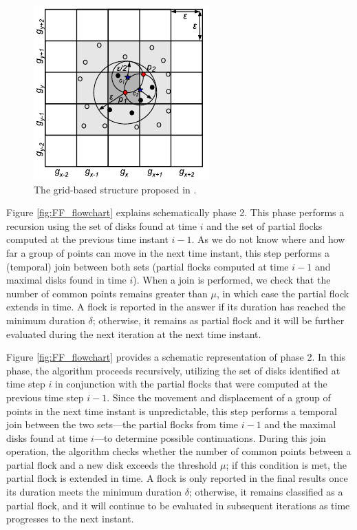 \begin{figure}
    \centering
    \includegraphics[width=0.6\linewidth]{figures/grid2}
    \caption{The grid-based structure proposed in \cite{vieira_-line_2009}.}\label{fig:grid}
\end{figure}

Figure \ref{fig:FF_flowchart} explains schematically phase 2. This phase performs a recursion using the set of disks found at time $i$ and the set of partial flocks computed at the  previous time instant $i-1$.  As we do not know where and how far a group of points can move in the next time instant, this step performs a (temporal) join between both sets (partial flocks computed at time $i-1$ and maximal disks found in time $i$).  When a join is performed, we check that the number of common points remains greater than $\mu$, in which case the partial flock extends in time. A flock is reported in the answer if its duration has reached the minimum duration $\delta$; otherwise, it remains as partial flock and it will be further evaluated during the next iteration at the next time instant.

Figure \ref{fig:FF_flowchart} provides a schematic representation of phase 2. In this phase, the algorithm proceeds recursively, utilizing the set of disks identified at time step $i$ in conjunction with the partial flocks that were computed at the previous time step $i-1$. Since the movement and displacement of a group of points in the next time instant is unpredictable, this step performs a temporal join between the two sets—the partial flocks from time $i-1$ and the maximal disks found at time $i$—to determine possible continuations. During this join operation, the algorithm checks whether the number of common points between a partial flock and a new disk exceeds the threshold $\mu$; if this condition is met, the partial flock is extended in time. A flock is only reported in the final results once its duration meets the minimum duration $\delta$; otherwise, it remains classified as a partial flock, and it will continue to be evaluated in subsequent iterations as time progresses to the next instant.

